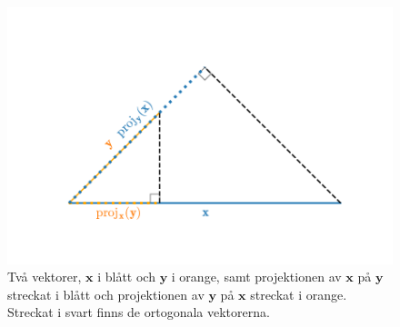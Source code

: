 \documentclass[a4paper, 12pt]{report}
\theoremstyle{definition}
\theoremstyle{remark}
\newcommand{\bfx}{\mathbf{x}}
\newcommand{\bfy}{\mathbf{y}}
\begin{document}
\begin{figure}[h]
	\centering
	\includegraphics[width=0.8\linewidth, trim={2.1cm 17mm 2cm 20mm}, clip]{KandFigur4.pdf}
	\caption{\label{fig:proj}Två vektorer, $\bfx$ i blått och $\bfy$ i orange, samt projektionen av $\bfx$ på $\bfy$ streckat i blått och projektionen av $\bfy$ på $\bfx$ streckat i orange. Streckat i svart finns de ortogonala vektorerna.}
\end{figure}
\end{document}
